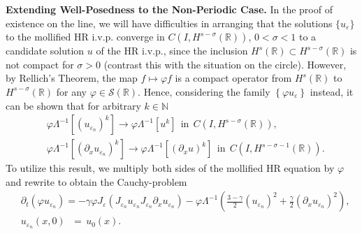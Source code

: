 \documentclass{beamer}
\newcommand{\rr}{\mathbb{R}}
\newcommand{\p}{\partial}
\newcommand{\ci}{\mathbb{T}}
\newcommand{\ee}{\varepsilon}
\newcommand{\vp}{\varphi}
\begin{document}
%
\begin{frame}
{\bf Extending Well-Posedness to the Non-Periodic Case.}
In the proof of existence on the line, we will have difficulties in 
arranging
that the solutions $\{u_\ee\}$ to the mollified HR i.v.p. converge in $C(I,
H^{s- \sigma}(\rr))$, $0 < \sigma < 1$ to a candidate solution $u$ of the 
HR i.v.p., since the inclusion $H^s(\rr) \subset H^{s-\sigma}(\rr)$ is not 
compact for $\sigma > 0$ (contrast this with the situation on the circle).  
However, by Rellich's Theorem, the map $f \mapsto \vp f$
is a compact operator from $H^s(\rr)$ to  $H^{s-\sigma}(\rr)$ for any $\vp 
\in \mathcal{S}(\rr)$.
Hence, considering the family $\left\{ \varphi
u_\ee \right\}$ instead, it can be shown that 
for arbitrary $k \in \mathbb{N}$
%
%
\begin{equation*}
\begin{split}
& \vp \Lambda^{-1} [(u_{\ee_n})^k] \to \vp \Lambda^{-1} [u^k] \ \ \text{in}  \ \ C(I,
H^{s-\sigma }(\rr)),
\\
& \vp \Lambda^{-1} [(\p_x u_{\ee_n})^k] \to \vp \Lambda^{-1} [(\p_x u)^k] \ \
\text{in}  \ \ C(I,
H^{s-\sigma -1}(\rr)).
\label{hhdx_vp_u_ep_conv}
\end{split}
\end{equation*}
%
%
%
%
To utilize this result, we multiply both sides of the mollified HR equation by 
$\varphi$ and rewrite to obtain the Cauchy-problem
%
%
\begin{align*}
 & \p_t(\vp u_{\ee_n} )  = -\gamma \vp J_\ee (J_{\ee_n} u_{\ee_n} 
J_{\ee_n} \p_x u_{\ee_n}) - \vp \Lambda^{-1} \left( \frac{3-\gamma}{2} 
(u_{\ee_n})^2
+ \frac{\gamma}{2} (\p_x u_{\ee_n})^2 \right ),
\\
& u_{\ee_n}(x, 0) \phantom{\,,} = \phantom{\,} u_0 (x).
\label{real-line-moli-data-2} 
\end{align*}
%
%
\end{frame}
\end{document}
